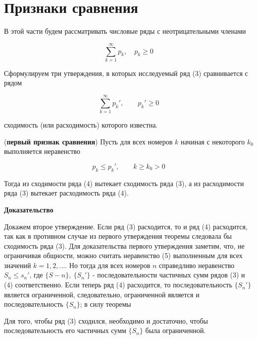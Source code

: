 \section{Признаки сравнения}
В этой части будем рассматривать числовые ряды с неотрицательными членами

\begin{equation}
	\displaystyle\sum_{k = 1}^\infty p_k,\quad p_k \geqslant 0
\end{equation}

Сформулируем три утверждения, в которых исследуемый ряд (3) сравнивается с рядом

\begin{equation}
	\displaystyle\sum_{k = 1}^\infty p_k',\qquad p_k' \geqslant 0
\end{equation}

сходимость (или расходимость) которого известна.

\begin{theorem}
	(\textbf{первый признак сравнения}) Пусть для всех номеров $k$ начиная с некоторого $k_0$ выполняется неравенство
	
	\begin{equation}
		p_k \leqslant p_k',\qquad k \geqslant k_0 > 0
	\end{equation}
	
	Тогда из сходимости ряда (4) вытекает сходимость ряда (3), а из расходимости ряда (3) вытекает расходимость ряда (4).
\end{theorem}

\textbf{Доказательство}

Докажем второе утверждение. Если ряд (3) расходится, то и ряд (4) расходится, так как в противном случае из первого утверждения теоремы следовала бы сходимость ряда (3). Для доказательства первого утверждения заметим, что, не ограничивая общности, можно считать неравенство (5) выполненным для всех значений $k = 1, 2, ...$. Но тогда для всех номеров $n$ справедливо неравенство $S_n \leqslant s_n'$, где $\{S-n\},\: \{S_n'\}$ - последовательности частичных сумм рядов (3) и (4) соответственно. Если теперь ряд (4) расходится, то последовательность $\{S_n'\}$ является ограниченной, следовательно, ограниченной является и последовательность $\{S_n\}$; в силу теоремы

\begin{theorem}
	Для того, чтобы ряд (3) сходился, необходимо и достаточно, чтобы последовательность его частичных сумм $\{S_n\}$ была ограниченной.
\end{theorem}

